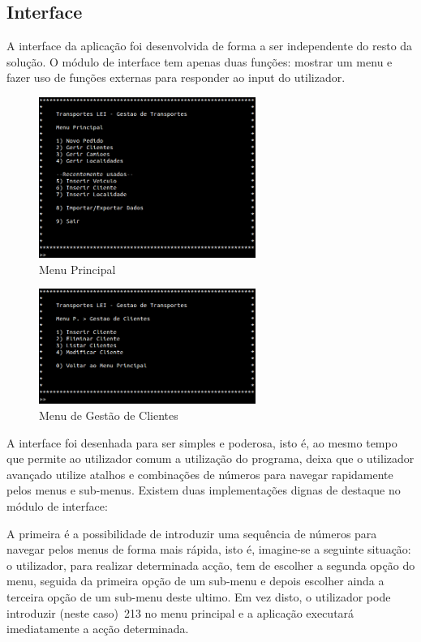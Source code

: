 \documentclass[a5paper,twocolumn, 11pt]{article}
\begin{document}
\subsection{Interface}
A interface da aplicação foi desenvolvida de forma a ser independente do resto da solução. O módulo de interface tem apenas duas funções: mostrar um menu e fazer uso de funções externas para responder ao input do utilizador.
\begin{figure}[hbt]
    \caption[Menu Principal]{Menu Principal}
    \label{menu principal}
    \centering
        \includegraphics[width=200pt]{menu_principal.png}
\end{figure}
\begin{figure}[hbt]
    \caption[Menu Gestão Clientes]{Menu de Gestão de Clientes}
    \label{menu gerir clientes}
    \centering
        \includegraphics[width=200pt]{menu_gestao_de_clientes.png}
\end{figure}

A interface foi desenhada para ser simples e poderosa, isto é, ao mesmo tempo que permite ao utilizador comum a utilização do programa, deixa que o utilizador avançado utilize atalhos e combinações de números para navegar rapidamente pelos menus e sub-menus.
Existem duas implementações dignas de destaque no módulo de interface:


A primeira é a possibilidade de introduzir uma sequência de números para navegar pelos menus de forma mais rápida, isto é, imagine-se a seguinte situação: o utilizador, para realizar determinada acção, tem de escolher a segunda opção do menu, seguida da primeira opção de um sub-menu e depois escolher ainda a terceira opção de um sub-menu deste ultimo. Em vez disto, o utilizador pode introduzir (neste caso)~213 no menu principal e a aplicação executará imediatamente a acção determinada.
\end{document}
